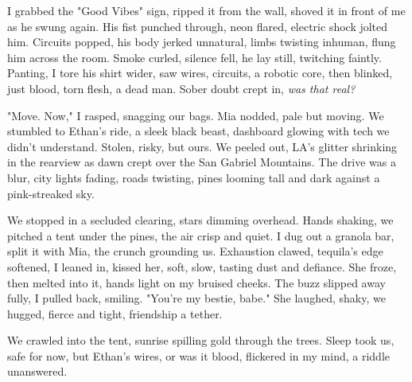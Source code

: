 \documentclass[12pt]{article} %
\begin{document}
I grabbed the "Good Vibes" sign, ripped it from the wall, shoved it in front of me as he swung again. His fist punched through, neon flared, electric shock jolted him. Circuits popped, his body jerked unnatural, limbs twisting inhuman, flung him across the room. Smoke curled, silence fell, he lay still, twitching faintly. Panting, I tore his shirt wider, saw wires, circuits, a robotic core, then blinked, just blood, torn flesh, a dead man. Sober doubt crept in, \textit{was that real?}

"Move. Now," I rasped, snagging our bags. \textnormal{Mia} nodded, pale but moving. We stumbled to \textnormal{Ethan}’s ride, a sleek black beast, dashboard glowing with tech we didn’t understand. Stolen, risky, but ours. We peeled out, LA’s glitter shrinking in the rearview as dawn crept over the San Gabriel Mountains. The drive was a blur, city lights fading, roads twisting, pines looming tall and dark against a pink-streaked sky.

We stopped in a secluded clearing, stars dimming overhead. Hands shaking, we pitched a tent under the pines, the air crisp and quiet. I dug out a granola bar, split it with \textnormal{Mia}, the crunch grounding us. Exhaustion clawed, tequila’s edge softened, I leaned in, kissed her, soft, slow, tasting dust and defiance. She froze, then melted into it, hands light on my bruised cheeks. The buzz slipped away fully, I pulled back, smiling. "You’re my bestie, babe." She laughed, shaky, we hugged, fierce and tight, friendship a tether.

We crawled into the tent, sunrise spilling gold through the trees. Sleep took us, safe for now, but \textnormal{Ethan}’s wires, or was it blood, flickered in my mind, a riddle unanswered.
\end{document}
